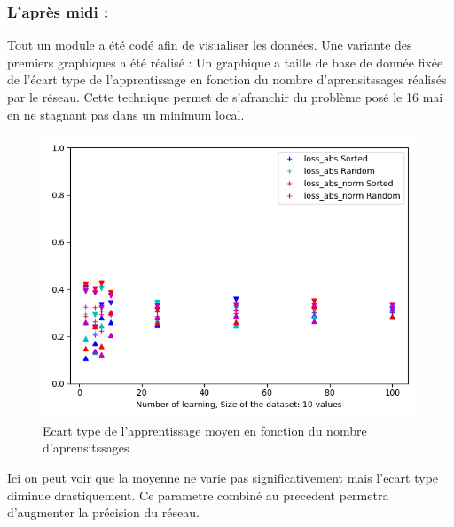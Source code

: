 \subsubsection*{L'après midi :}
Tout un module a été codé afin de visualiser les données.
Une variante des premiers graphiques a été réalisé :
Un graphique a taille de base de donnée fixée de l'écart type de l'apprentissage en fonction du nombre d'aprensitssages réalisés par le réseau.
Cette technique permet de s'afranchir du problème posé le 16 mai en ne stagnant pas dans un minimum local.

\begin{figure}[H]
    \center
    \includegraphics[height=\moyen]{sources/data/etfn/graph1.png}
	\caption{Ecart type de l'apprentissage moyen en fonction du nombre d'aprensitssages}
	\label{etfngraph1}
\end{figure}
\vspace{-5pt}
Ici on peut voir que la moyenne ne varie pas significativement mais l'ecart type diminue drastiquement.
Ce parametre combiné au precedent permetra d'augmenter la précision du réseau.

